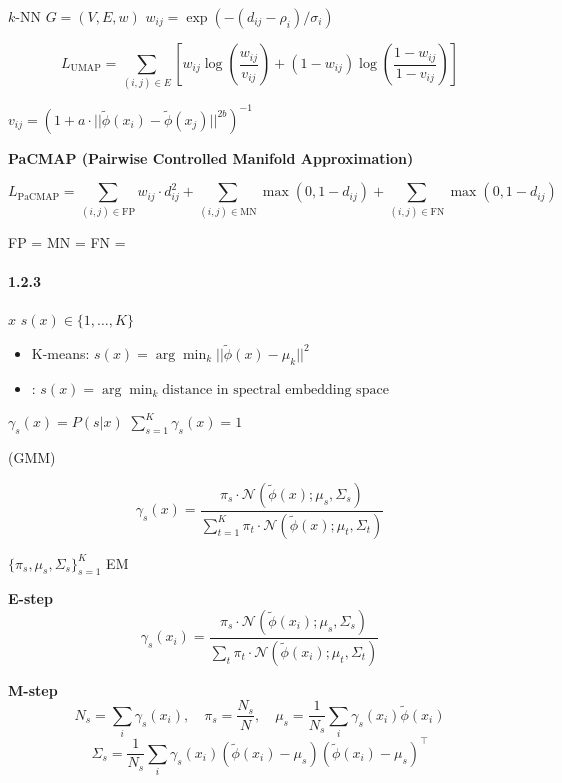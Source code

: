 \documentclass[
  12pt,
]{article}
\providecommand{\tightlist}{%
  \setlength{\itemsep}{0pt}\setlength{\parskip}{0pt}}
\begin{document}
 \(k\)-NN  \(G = (V, E, w)\)
\(w_{ij} = \exp(-(d_{ij} - \rho_i)/\sigma_i)\)

\[
L_{\text{UMAP}} = \sum_{(i,j) \in E} \left[ w_{ij} \log\left(\frac{w_{ij}}{v_{ij}}\right) + (1 - w_{ij}) \log\left(\frac{1 - w_{ij}}{1 - v_{ij}}\right) \right]
\]


\(v_{ij} = (1 + a \cdot ||\tilde{\phi}(x_i) - \tilde{\phi}(x_j)||^{2b})^{-1}\)


\textbf{PaCMAP (Pairwise Controlled Manifold Approximation)}



\[
L_{\text{PaCMAP}} = \sum_{(i,j) \in \text{FP}} w_{ij} \cdot d_{ij}^2 + \sum_{(i,j) \in \text{MN}} \max(0, 1 - d_{ij}) + \sum_{(i,j) \in \text{FN}} \max(0, 1 - d_{ij})
\]

 FP = MN = FN = 

\paragraph{1.2.3 }\label{ux72b6ux6001ux5206ux914d}

\textbf{}

 \(x\) \(s(x) \in \{1, \dots, K\}\)

\begin{itemize}
\tightlist
\item
  K-means: \(s(x) = \arg\min_k ||\tilde{\phi}(x) - \mu_k||^2\)
\item
  :
  \(s(x) = \arg\min_k \text{distance in spectral embedding space}\)
\end{itemize}

\textbf{}

 \(\gamma_s(x) = P(s|x)\)
\(\sum_{s=1}^K \gamma_s(x) = 1\)

 (GMM) 

\[
\gamma_s(x) = \frac{\pi_s \cdot \mathcal{N}(\tilde{\phi}(x); \mu_s, \Sigma_s)}{\sum_{t=1}^K \pi_t \cdot \mathcal{N}(\tilde{\phi}(x); \mu_t, \Sigma_t)}
\]

 \(\{ \pi_s, \mu_s, \Sigma_s \}_{s=1}^K\)  EM 

\textbf{E-step} \[
\gamma_s(x_i) = \frac{\pi_s \cdot \mathcal{N}(\tilde{\phi}(x_i); \mu_s, \Sigma_s)}{\sum_t \pi_t \cdot \mathcal{N}(\tilde{\phi}(x_i); \mu_t, \Sigma_t)}
\]

\textbf{M-step} \[
N_s = \sum_i \gamma_s(x_i), \quad \pi_s = \frac{N_s}{N}, \quad \mu_s = \frac{1}{N_s} \sum_i \gamma_s(x_i) \tilde{\phi}(x_i)
\] \[
\Sigma_s = \frac{1}{N_s} \sum_i \gamma_s(x_i) (\tilde{\phi}(x_i) - \mu_s)(\tilde{\phi}(x_i) - \mu_s)^\top
\]
\end{document}
